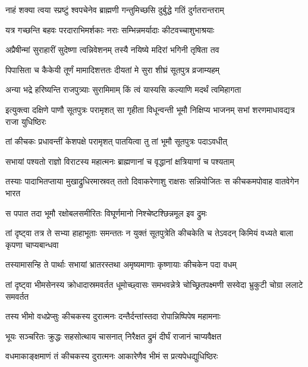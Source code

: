 \twolineshloka
{नाहं शक्या त्वया स्प्रष्टुं श्वपचेनेव ब्राह्मणी}
{गन्तुमिच्छसि दुर्बुद्धे गतिं दुर्गतरान्तराम्}


\twolineshloka
{यत्र गच्छन्ति बहवः परदाराभिमर्शकाः}
{नराः सम्भिन्नमर्यादाः कीटवच्चाशुभाश्रयाः}


\twolineshloka
{अप्रैषीन्मां सुराहारीं सुदेष्णा त्वन्निवेशनम्}
{तस्यै नयिष्ये मदिरां भगिनी तृषिता तव}


\twolineshloka
{पिपासिता च कैकेयी तूर्णं मामादिशत्ततः}
{दीयतां मे सुरा शीघ्रं सूतपुत्र व्रजाम्यहम्}




\twolineshloka
{अन्या भद्रे हरिष्यन्ति राजपुत्र्याः सुरामिमाम्}
{किं त्वं यास्यसि कल्याणि मदर्थं त्वमिहागता}



\threelineshloka
{इत्युक्त्वा दक्षिणे पाणौ सूतपुत्रः परामृशत्}
{सा गृहीता विधून्वन्ती भूमौ निक्षिप्य भाजनम्}
{सभां शरणमाधावद्यत्र राजा युधिष्ठिरः}


\twolineshloka
{तां कीचकः प्रधावन्तीं केशपक्षे परामृशत्}
{पातयित्वा तु तां भूमौ सूतपुत्रः पदाऽवधीत्}


\twolineshloka
{सभायां पश्यतो राज्ञो विराटस्य महात्मनः}
{ब्राह्मणानां च वृद्धानां क्षत्रियाणां च पश्यताम्}


\onelineshloka
{तस्याः पादाभितप्ताया मुखाद्रुधिरमास्रवत्}
\twolineshloka
{ततो दिवाकरेणाशु राक्षसः सन्नियोजितः}
{स कीचकमपोवाह वातवेगेन भारत}


\twolineshloka
{स पपात तदा भूमौ रक्षोबलसमीरितः}
{विघूर्णमानो निश्चेष्टश्छिन्नमूल इव द्रुमः}


\threelineshloka
{तां दृष्ट्वा तत्र ते सभ्या हाहाभूताः समन्ततः}
{न युक्तं सूतपुत्रेति कीचकेति च तेऽवदन्}
{किमियं वध्यते बाला कृपणा चाप्यबान्धवा}


\twolineshloka
{तस्यामासन्हि ते पार्थाः सभायां भ्रातरस्तथा}
{अमृष्यमाणाः कृष्णायाः कीचकेन पदा वधम्}


\threelineshloka
{तां दृष्ट्वा भीमसेनस्य क्रोधादास्रमवर्तत}
{धूमोच्छ्वासः समभवन्नेत्रे चोच्छ्रितपक्ष्मणी}
{सस्वेदा भ्रुकुटी चोग्रा ललाटे समवर्तत}


\twolineshloka
{तस्य भीमो वधप्रेप्सुः कीचकस्य दुरात्मनः}
{दन्तैर्दन्तांस्तदा रोपान्निष्पिपेष महामनाः}


\twolineshloka
{भूयः सञ्चरितः क्रुद्धः सहसोत्थाय चासनात्}
{निरैक्षत द्रुमं दीर्घं राजानं चाप्यवैक्षत}


\twolineshloka
{वधमाकाङ्क्षमाणं तं कीचकस्य दुरात्मनः}
{आकारेणैव भीमं स प्रत्यपेधद्युधिष्ठिरः}


